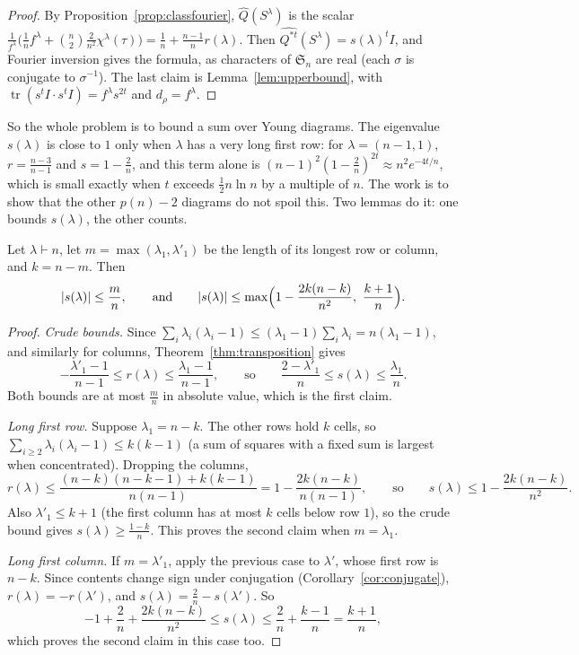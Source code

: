 \begin{proof}
By Proposition~\ref{prop:classfourier}, $\hat Q(S^\lambda)$ is the scalar $\frac1{f^\lambda}\bigl(\frac1nf^\lambda+\binom n2\frac2{n^2}\chi^\lambda(\tau)\bigr)=\frac1n+\frac{n-1}nr(\lambda)$. Then $\widehat{Q^{*t}}(S^\lambda)=s(\lambda)^tI$, and Fourier inversion gives the formula, as characters of
$\mathfrak S_n$ are real (each $\sigma$ is conjugate to $\sigma^{-1}$). The last claim is Lemma~\ref{lem:upperbound}, with $\operatorname{tr}(s^tI\cdot s^tI)=f^\lambda s^{2t}$ and $d_\rho=f^\lambda$.
\end{proof}

So the whole problem is to bound a sum over Young diagrams. The eigenvalue $s(\lambda)$ is close to $1$ only when $\lambda$ has a very long first row: for $\lambda=(n-1,1)$, $r=\frac{n-3}{n-1}$ and $s=1-\frac2n$, and this term alone is $(n-1)^2(1-\frac2n)^{2t}\approx n^2e^{-4t/n}$,
which is small exactly when $t$ exceeds $\frac12n\ln n$ by a multiple of $n$. The work is to show that the other $p(n)-2$ diagrams do not spoil this. Two lemmas do it: one bounds $s(\lambda)$, the other counts.

\begin{lemma}\label{lem:ratiobounds}
Let $\lambda\vdash n$, let $m=\max(\lambda_1,\lambda'_1)$ be the length of its longest row or column, and $k=n-m$. Then
\[
|s(\lambda)|\le\frac mn,\qquad\text{and}\qquad|s(\lambda)|\le\max\Bigl(1-\frac{2k(n-k)}{n^2},\ \frac{k+1}n\Bigr).
\]
\end{lemma}

\begin{proof}
\emph{Crude bounds.} Since $\sum_i\lambda_i(\lambda_i-1)\le(\lambda_1-1)\sum_i\lambda_i=n(\lambda_1-1)$, and similarly for columns, Theorem~\ref{thm:transposition} gives
\[
-\frac{\lambda'_1-1}{n-1}\le r(\lambda)\le\frac{\lambda_1-1}{n-1},\qquad\text{so}\qquad\frac{2-\lambda'_1}n\le s(\lambda)\le\frac{\lambda_1}n.
\]
Both bounds are at most $\frac mn$ in absolute value, which is the first claim.

\emph{Long first row.} Suppose $\lambda_1=n-k$. The other rows hold $k$ cells, so $\sum_{i\ge2}\lambda_i(\lambda_i-1)\le k(k-1)$ (a sum of squares with a fixed sum is largest when concentrated). Dropping the columns,
\[
r(\lambda)\le\frac{(n-k)(n-k-1)+k(k-1)}{n(n-1)}=1-\frac{2k(n-k)}{n(n-1)},\qquad\text{so}\qquad s(\lambda)\le1-\frac{2k(n-k)}{n^2}.
\]
Also $\lambda'_1\le k+1$ (the first column has at most $k$ cells below row $1$), so the crude bound gives $s(\lambda)\ge\frac{1-k}n$. This proves the second claim when $m=\lambda_1$.

\emph{Long first column.} If $m=\lambda'_1$, apply the previous case to $\lambda'$, whose first row is $n-k$. Since contents change sign under conjugation (Corollary~\ref{cor:conjugate}), $r(\lambda)=-r(\lambda')$, and $s(\lambda)=\frac2n-s(\lambda')$. So
\[
-1+\frac2n+\frac{2k(n-k)}{n^2}\le s(\lambda)\le\frac2n+\frac{k-1}n=\frac{k+1}n,
\]
which proves the second claim in this case too.
\end{proof}

